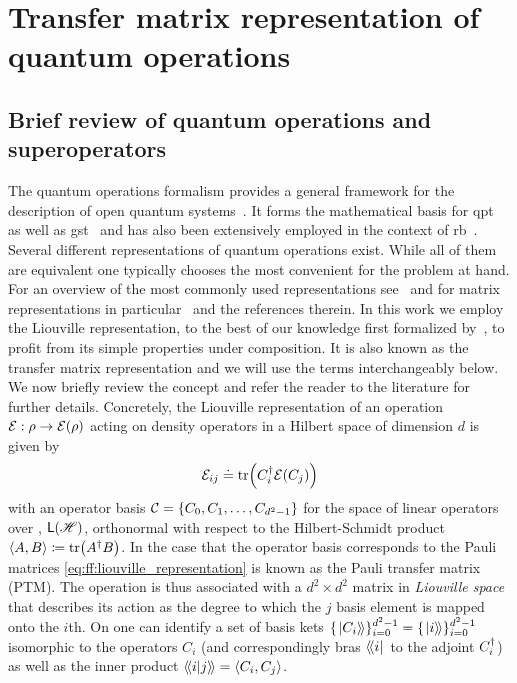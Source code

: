 \section{Transfer matrix representation of quantum operations}\label{sec:ff:theory:transfer_matrix}
\subsection{Brief review of quantum operations and superoperators}
The quantum operations formalism provides a general framework for the description of open quantum systems~\cite{Kraus1983,Nielsen2011}.
It forms the mathematical basis for \gls{qpt}~\cite{Chuang1997,Poyatos1997} as well as \gls{gst}~\cite{Blume-Kohout2013,Greenbaum2015} and has also been extensively employed in the context of \gls{rb}~\cite{Magesan2012a,Kimmel2014}.
Several different representations of quantum operations exist.
While all of them are equivalent one typically chooses the most convenient for the problem at hand.
For an overview of the most commonly used representations see~ and for matrix representations in particular~ and the references therein.
In this work we employ the Liouville representation, to the best of our knowledge first formalized by~\citeauthor{Fano1957}, to profit from its simple properties under composition.
It is also known as the transfer matrix representation and we will use the terms interchangeably below.
We now briefly review the concept and refer the reader to the literature for further details.
Concretely, the Liouville representation of an operation $\mathcal{E}: \rho\rightarrow\mathcal{E}(\rho)$ acting on density operators in a Hilbert space \Hspace of dimension $d$ is given by
\begin{equation}\label{eq:ff:liouville_representation}
    \mathcal{E}_{ij}\doteq\tr(C_i^\dagger\mathcal{E}(C_j))
\end{equation}
with an operator basis $\mathcal{C}=\lbrace C_0, C_1, \dotsc, C_{d^2-1}\rbrace$ for the space of linear operators over \Hspace, $\mathsf{L}(\mathscr{H})$, orthonormal with respect to the Hilbert-Schmidt product $\expval{A,B}\coloneqq\tr(A^\dagger B)$.
In the case that the operator basis corresponds to the Pauli matrices \cref{eq:ff:liouville_representation} is known as the Pauli transfer matrix (PTM).
The operation \qp is thus associated with a $d^2\times d^2$ matrix in \emph{Liouville space} \Lspace that describes its action as the degree to which the $j$ basis element is mapped onto the $i$th.
On \Lspace one can identify a set of basis kets $\lbrace\mbox{\ensuremath{\left.\ket{C_i}\!\right\rangle}}\rbrace_{i=0}^{d^2-1} = \lbrace\mbox{\ensuremath{\left.\ket{i}\!\right\rangle}}\rbrace_{i=0}^{d^2-1}$ isomorphic to the operators $C_i$ (and correspondingly bras $\mbox{\ensuremath{\left\langle\!\bra{i}\right.}}$ to the adjoint $C_i^\dagger$) as well as the inner product $\mbox{\ensuremath{\left\langle\!\braket{i}{j}\!\right\rangle}} = \expval{C_i,C_j}$.
